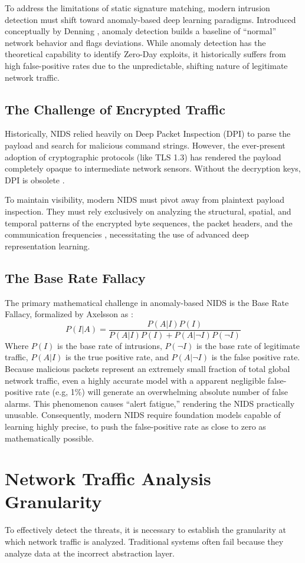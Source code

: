 \documentclass[12pt, a4paper]{report}
\begin{document}
To address the limitations of static signature matching, modern intrusion detection must shift toward anomaly-based deep learning paradigms. Introduced conceptually by Denning \cite{denning1987intrusion}, anomaly detection builds a baseline of ``normal'' network behavior and flags deviations. While anomaly detection has the theoretical capability to identify Zero-Day exploits, it historically suffers from high false-positive rates due to the unpredictable, shifting nature of legitimate network traffic.

\subsection{The Challenge of Encrypted Traffic}
Historically, NIDS relied heavily on Deep Packet Inspection (DPI) to parse the payload and search for malicious command strings. However, the ever-present adoption of cryptographic protocols (like TLS 1.3) has rendered the payload completely opaque to intermediate network sensors. Without the decryption keys, DPI is obsolete \cite{anderson2016machine}. 

To maintain visibility, modern NIDS must pivot away from plaintext payload inspection. They must rely exclusively on analyzing the structural, spatial, and temporal patterns of the encrypted byte sequences, the packet headers, and the communication frequencies , necessitating the use of advanced deep representation learning.

\subsection{The Base Rate Fallacy}
The primary mathematical challenge in anomaly-based NIDS is the Base Rate Fallacy, formalized by Axelsson \cite{axelsson1999base} as : $$P(I|A) = \frac{P(A|I)P(I)}{P(A|I)P(I) + P(A|\neg I)P(\neg I)}$$ Where $P(I)$ is the base rate of intrusions, $P(\neg I)$ is the base rate of legitimate traffic, $P(A|I)$ is the true positive rate, and $P(A|\neg I)$ is the false positive rate. Because malicious packets represent an extremely small fraction of total global network traffic, even a highly accurate model with a apparent
negligible false-positive rate (e.g, 1\%) will generate an overwhelming absolute number of false alarms. This phenomenon causes ``alert fatigue,'' rendering the NIDS practically unusable. Consequently, modern NIDS require foundation models capable of learning highly precise, to push the false-positive rate as close to zero as mathematically possible.
\section{Network Traffic Analysis Granularity}
To effectively detect the threats, it is necessary to establish the granularity at which network traffic is analyzed. Traditional systems often fail because they analyze data at the incorrect abstraction layer.
\end{document}

